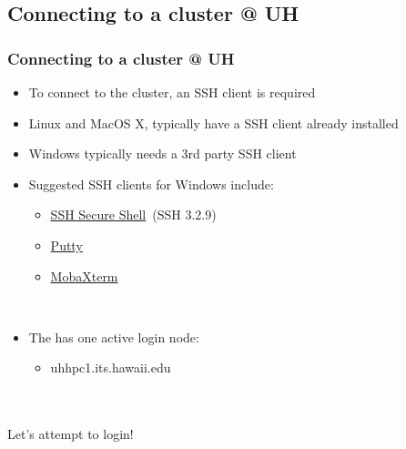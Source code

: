 \subsection{Connecting to a cluster @ UH}
\begin{frame}
	\frametitle{Connecting to a cluster @ UH}
	\begin{description}[\setlength{\leftmargini}{0pt}]
	\item[] \begin{itemize}
		\item To connect to the cluster, an SSH client is required
		\item Linux and MacOS X, typically have a SSH client already installed
		\item Windows typically needs a 3rd party SSH client
		\item Suggested SSH clients for Windows include:
		\begin{itemize}
			\item \href{http://www.hawaii.edu/askus/685}{SSH Secure Shell}~(SSH 3.2.9)
			\item \href{http://www.chiark.greenend.org.uk/~sgtatham/putty/download.html}{Putty}
                        \item \href{http://mobaxterm.mobatek.net/}{MobaXterm}
		\end{itemize}
	\end{itemize}
	\item[] ~\\
	\item[] \begin{itemize}
		\item The {\craycs} has one active login node:
		\begin{itemize}
			\item uhhpc1.its.hawaii.edu
		\end{itemize}
	\end{itemize}
	\end{description}
        ~\\~\\
	{\large Let's attempt to login!}
\end{frame}


